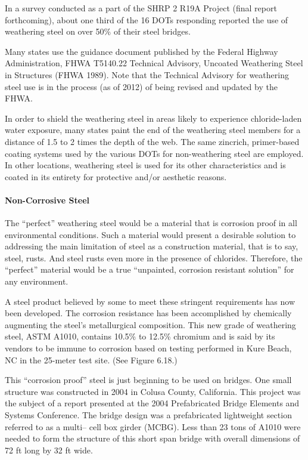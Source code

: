 In a survey conducted as a part of the SHRP 2 R19A Project (final report forthcoming), about one third of the 16
DOTs responding reported the use of weathering steel on over 50\% of their steel bridges.

Many states use the guidance document published by the Federal Highway Administration, FHWA T5140.22
Technical Advisory, Uncoated Weathering Steel in Structures (FHWA 1989). Note that the Technical Advisory for
weathering steel use is in the process (as of 2012) of being revised and updated by the FHWA.

In order to shield the weathering steel in areas likely to experience chloride-laden water exposure, many states
paint the end of the weathering steel members for a distance of 1.5 to 2 times the depth of the web. The same zincrich,
primer-based coating systems used by the various DOTs for non-weathering steel are employed. In other locations, weathering steel is used for its other characteristics and is coated in its entirety for protective and/or
aesthetic reasons.

\paragraph{Non-Corrosive Steel}
The “perfect” weathering steel would be a material that is corrosion proof in all environmental conditions. Such a
material would present a desirable solution to addressing the main limitation of steel as a construction material, that
is to say, steel, rusts. And steel rusts even more in the presence of chlorides. Therefore, the “perfect” material would
be a true “unpainted, corrosion resistant solution” for any environment.

A steel product believed by some to meet these stringent requirements has now been developed. The corrosion
resistance has been accomplished by chemically augmenting the steel’s metallurgical composition. This new grade of
weathering steel, ASTM A1010, contains 10.5\% to 12.5\% chromium and is said by its vendors to be immune to
corrosion based on testing performed in Kure Beach, NC in the 25-meter test site. (See Figure 6.18.)

This “corrosion proof” steel is just beginning to be used on bridges. One small structure was constructed in 2004
in Colusa County, California. This project was the subject of a report presented at the 2004 Prefabricated Bridge
Elements and Systems Conference. The bridge design was a prefabricated lightweight section referred to as a multi--
cell box girder (MCBG). Less than 23 tons of A1010 were needed to form the structure of this short span bridge
with overall dimensions of 72 ft long by 32 ft wide.

